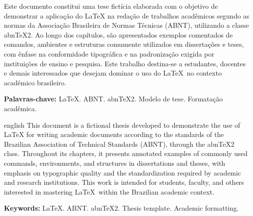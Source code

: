 \setlength{\absparsep}{18pt} %

\begin{resumo}
    Este documento constitui uma tese fictícia elaborada com o objetivo de demonstrar a aplicação do \LaTeX{} na redação de trabalhos acadêmicos segundo as normas da Associação Brasileira de Normas Técnicas (ABNT), utilizando a classe abn\TeX 2. Ao longo dos capítulos, são apresentados exemplos comentados de comandos, ambientes e estruturas comumente utilizados em dissertações e teses, com ênfase na conformidade tipográfica e na padronização exigida por instituições de ensino e pesquisa. Este trabalho destina-se a estudantes, docentes e demais interessados que desejam dominar o uso do \LaTeX\ no contexto acadêmico brasileiro.

    \textbf{Palavras-chave:} LaTeX. ABNT. abnTeX2. Modelo de tese. Formatação acadêmica.
\end{resumo}


\begin{resumo}[Abstract]
    \begin{otherlanguage*}{english}
        This document is a fictional thesis developed to demonstrate the use of \LaTeX{} for writing academic documents according to the standards of the Brazilian Association of Technical Standards (ABNT), through the abn\TeX 2 class. Throughout its chapters, it presents annotated examples of commonly used commands, environments, and structures in dissertations and theses, with emphasis on typographic quality and the standardization required by academic and research institutions. This work is intended for students, faculty, and others interested in mastering \LaTeX\ within the Brazilian academic context.

        \textbf{Keywords:} LaTeX. ABNT. abnTeX2. Thesis template. Academic formatting.
    \end{otherlanguage*}
\end{resumo}
